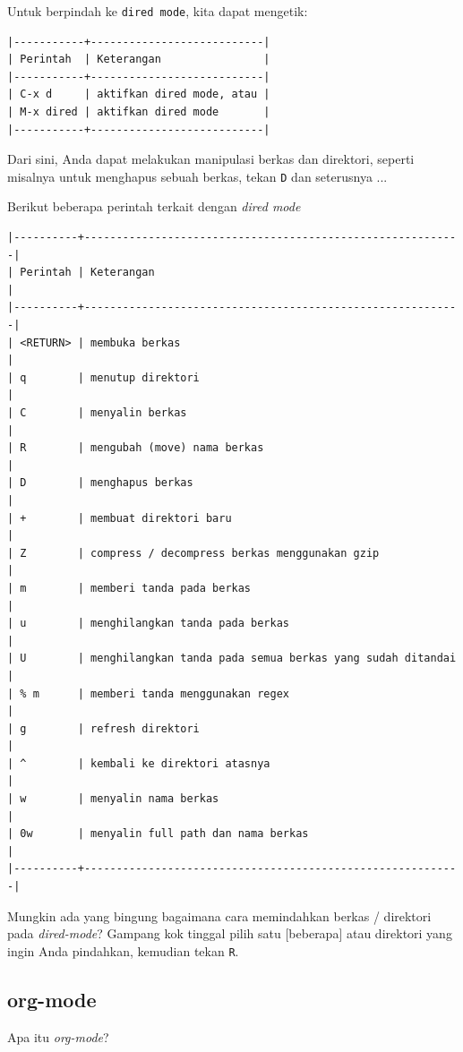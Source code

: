 \documentclass{article}
\begin{document}
Untuk berpindah ke \verb=dired mode=, kita dapat mengetik:

\begin{verbatim}
|-----------+---------------------------|
| Perintah  | Keterangan                |
|-----------+---------------------------|
| C-x d     | aktifkan dired mode, atau |
| M-x dired | aktifkan dired mode       |
|-----------+---------------------------|
\end{verbatim}

Dari sini, Anda dapat melakukan manipulasi berkas dan direktori, seperti 
misalnya untuk menghapus sebuah berkas, tekan \verb=D= dan seterusnya ...

Berikut beberapa perintah terkait dengan \emph{dired mode}

\begin{verbatim}
|----------+-----------------------------------------------------------|
| Perintah | Keterangan                                                |
|----------+-----------------------------------------------------------|
| <RETURN> | membuka berkas                                            |
| q        | menutup direktori                                         |
| C        | menyalin berkas                                           |
| R        | mengubah (move) nama berkas                               |
| D        | menghapus berkas                                          |
| +        | membuat direktori baru                                    |
| Z        | compress / decompress berkas menggunakan gzip             |
| m        | memberi tanda pada berkas                                 |
| u        | menghilangkan tanda pada berkas                           |
| U        | menghilangkan tanda pada semua berkas yang sudah ditandai |
| % m      | memberi tanda menggunakan regex                           |
| g        | refresh direktori                                         |
| ^        | kembali ke direktori atasnya                              |
| w        | menyalin nama berkas                                      |
| 0w       | menyalin full path dan nama berkas                        |
|----------+-----------------------------------------------------------|
\end{verbatim}

Mungkin ada yang bingung bagaimana cara memindahkan berkas / direktori
pada \emph{dired-mode}? Gampang kok tinggal pilih satu [beberapa] atau 
direktori yang ingin Anda pindahkan, kemudian tekan \verb=R=.

\subsection{org-mode}
Apa itu \emph{org-mode}? 
\end{document}
